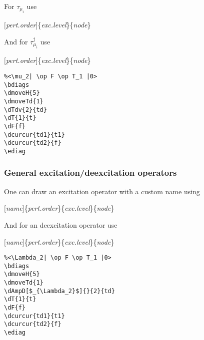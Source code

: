 \documentclass[a4paper]{article}
\newcommand{\myind}{\hspace{10pt}}
\begin{document}
For $\tau_{\mu_i}$ use

\myind{\bf \textbackslash dTv}$[${\it pert.order}$]$\{{\it exc.level}\}\{{\it node}\}

And for $\tau^{\dagger}_{\mu_i}$ use

\myind{\bf \textbackslash dTdv}$[${\it pert.order}$]$\{{\it exc.level}\}\{{\it node}\}

 \begin{minipage}[b]{0.55\linewidth}\centering
  \begin{lstlisting}
%<\mu_2| \op F \op T_1 |0>
\bdiags
\dmoveH{5}
\dmoveTd{1}
\dTdv{2}{td}
\dT{1}{t}
\dF{f}
\dcurcur{td1}{t1}
\dcurcur{td2}{f}
\ediag
  \end{lstlisting}
 \end{minipage}
 \begin{minipage}[b]{0.45\linewidth}\centering
\bdiags
{}
\ediag
 \end{minipage}

\subsubsection{General excitation/deexcitation operators}

One can draw an excitation operator with a custom name using

\myind{\bf \textbackslash dAmp}$[${\it name}$]$\{{\it pert.order}\}\{{\it exc.level}\}\{{\it node}\}

And for an deexcitation operator use 

\myind{\bf \textbackslash dAmpD}$[${\it name}$]$\{{\it pert.order}\}\{{\it exc.level}\}\{{\it node}\}

 \begin{minipage}[b]{0.55\linewidth}\centering
  \begin{lstlisting}
%<\Lambda_2| \op F \op T_1 |0>
\bdiags
\dmoveH{5}
\dmoveTd{1}
\dAmpD[$_{\Lambda_2}$]{}{2}{td}
\dT{1}{t}
\dF{f}
\dcurcur{td1}{t1}
\dcurcur{td2}{f}
\ediag
  \end{lstlisting}
 \end{minipage}
 \begin{minipage}[b]{0.45\linewidth}\centering
\bdiags
{}
\ediag
 \end{minipage}
\end{document}
